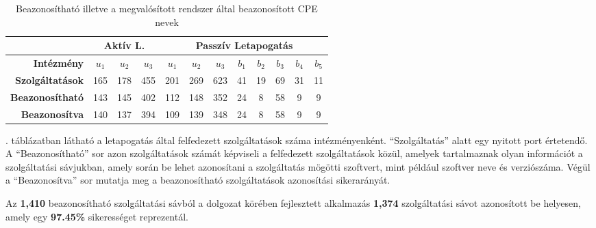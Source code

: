 	\begin{table}[H]
		\centering
		\begin{tabular}{r|ccc|ccc|ccccc|}
			\cline{2-12}
			\multicolumn{1}{l|}{}                         & \multicolumn{3}{c|}{\textbf{Aktív L.}} & \multicolumn{8}{c|}{\textbf{Passzív Letapogatás}}                                                             \\ \hline
			\multicolumn{1}{|r|}{\textbf{Intézmény}}      & \textbf{$u_1$}    & \textbf{$u_2$}    & \textbf{$u_3$}   & \textbf{$u_1$} & \textbf{$u_2$} & \textbf{$u_3$} & \textbf{$b_1$} & \textbf{$b_2$} & \textbf{$b_3$} & \textbf{$b_4$} & \textbf{$b_5$} \\ \hline
			\multicolumn{1}{|r|}{\textbf{Szolgáltatások}} & 165            & 178            & 455           & 201         & 269         & 623         & 41          & 19          & 69          & 31          & 11          \\
			\multicolumn{1}{|r|}{\textbf{Beazonosítható}} & 143            & 145            & 402           & 112         & 148         & 352         & 24          & 8           & 58          & 9           & 9           \\
			\multicolumn{1}{|r|}{\textbf{Beazonosítva}}   & 140            & 137            & 394           & 109         & 139         & 348         & 24          & 8           & 58          & 9           & 9           \\ \hline
		\end{tabular}
		\caption{Beazonosítható illetve a megvalósított rendszer által beazonosított CPE nevek}
		\label{cpeids_hu}
	\end{table}
	
	\Az{\ref{cpeids_hu}}. táblázatban látható a letapogatás által felfedezett szolgáltatások száma intézményenként. ``Szolgáltatás'' alatt egy nyitott port értetendő. A ``Beazonosítható'' sor azon szolgáltatások számát képviseli a felfedezett szolgáltatások közül, amelyek tartalmaznak olyan információt a szolgáltatási sávjukban, amely során be lehet azonosítani a szolgáltatás mögötti szoftvert, mint például szoftver neve és verziószáma. Végül a ``Beazonosítva'' sor mutatja meg a beazonosítható szolgáltatások azonosítási sikerarányát.
	
	Az \textbf{1,410} beazonosítható szolgáltatási sávból a dolgozat körében fejlesztett alkalmazás \textbf{1,374} szolgáltatási sávot azonosított be helyesen, amely egy \textbf{97.45\%} sikerességet reprezentál.
	
